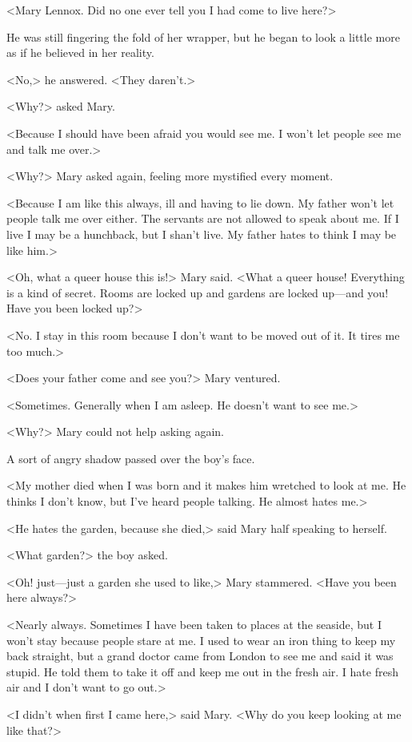 <Mary Lennox. Did no one ever tell you I had come to live here?>

He was still fingering the fold of her wrapper, but he began to look a little more as if he believed in her reality.

<No,> he answered. <They daren't.>

<Why?> asked Mary.

<Because I should have been afraid you would see me. I won't let people see me and talk me over.>

<Why?> Mary asked again, feeling more mystified every moment.

<Because I am like this always, ill and having to lie down. My father won't let people talk me over either. The servants are not allowed to speak about me. If I live I may be a hunchback, but I shan't live. My father hates to think I may be like him.>

<Oh, what a queer house this is!> Mary said. <What a queer house! Everything is a kind of secret. Rooms are locked up and gardens are locked up—and you! Have you been locked up?>

<No. I stay in this room because I don't want to be moved out of it. It tires me too much.>

<Does your father come and see you?> Mary ventured.

<Sometimes. Generally when I am asleep. He doesn't want to see me.>

<Why?> Mary could not help asking again.

A sort of angry shadow passed over the boy's face.

<My mother died when I was born and it makes him wretched to look at me. He thinks I don't know, but I've heard people talking. He almost hates me.>

<He hates the garden, because she died,> said Mary half speaking to herself.

<What garden?> the boy asked.

<Oh! just—just a garden she used to like,> Mary stammered. <Have you been here always?>

<Nearly always. Sometimes I have been taken to places at the seaside, but I won't stay because people stare at me. I used to wear an iron thing to keep my back straight, but a grand doctor came from London to see me and said it was stupid. He told them to take it off and keep me out in the fresh air. I hate fresh air and I don't want to go out.>

<I didn't when first I came here,> said Mary. <Why do you keep looking at me like that?>

